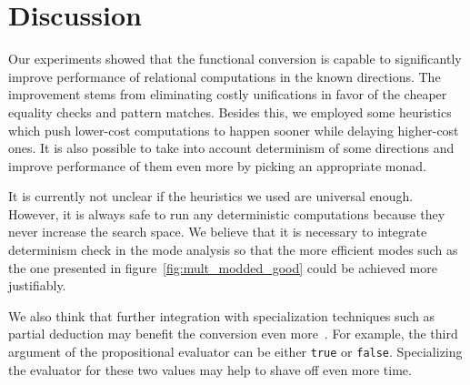 \section{Discussion}

Our experiments showed that the functional conversion is capable to significantly improve performance of relational computations in the known directions.
The improvement stems from eliminating costly unifications in favor of the cheaper equality checks and pattern matches.
Besides this, we employed some heuristics which push lower-cost computations to happen sooner while delaying higher-cost ones.
It is also possible to take into account determinism of some directions and improve performance of them even more by picking an appropriate monad.

It is currently not unclear if the heuristics we used are universal enough.
However, it is always safe to run any deterministic computations because they never increase the search space.
We believe that it is necessary to integrate determinism check in the mode analysis so that the more efficient modes such as the one presented in figure~\ref{fig:mult_modded_good} could be achieved more justifiably.

We also think that further integration with specialization techniques such as partial deduction may benefit the conversion even more~\cite{verbitskaia2021empirical}.
For example, the third argument of the propositional evaluator can be either \lstinline{true} or \lstinline{false}.
Specializing the evaluator for these two values may help to shave off even more time.
